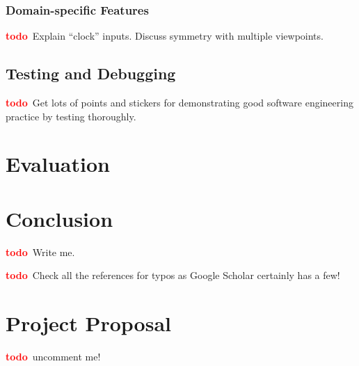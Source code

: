 \documentclass[12pt,a4paper,twoside,openright]{report}
\newcommand{\todo}{\textcolor{red}{\textbf{todo}~}}
\begin{document}
\subsection{Domain-specific Features}

\todo Explain ``clock'' inputs. Discuss symmetry with multiple viewpoints.

\section{Testing and Debugging}

\todo Get lots of points and stickers for demonstrating good software
engineering practice by testing thoroughly.

\chapter{Evaluation}\label{chap:eval}


\chapter{Conclusion}

\todo Write me.

\printbibliography
{}
\todo Check all the references for typos as Google Scholar certainly has a few!

\appendix

\chapter{Project Proposal}

\todo uncomment me!
%
\end{document}
